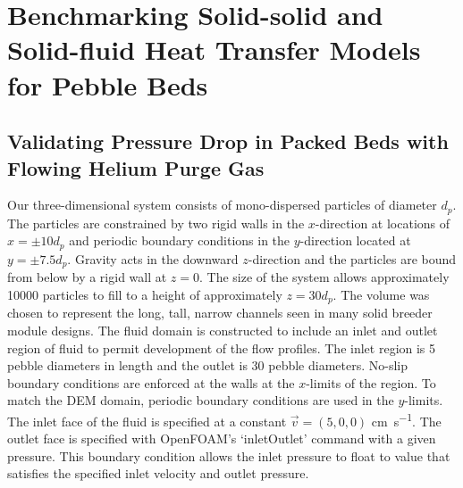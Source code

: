 \FloatBarrier
\section{Benchmarking Solid-solid and Solid-fluid Heat Transfer Models for Pebble Beds}

\subsection{Validating Pressure Drop in Packed Beds with Flowing Helium Purge Gas}
Our three-dimensional system consists of mono-dispersed particles of diameter $d_p$. The particles are constrained by two rigid walls in the $x$-direction at locations of $x = \pm 10d_p$  and periodic boundary conditions in the $y$-direction located at $y = \pm 7.5d_p$. Gravity acts in the downward $z$-direction and the particles are bound from below by a rigid wall at $z=0$. The size of the system allows approximately \num{10000} particles to fill to a height of approximately $z = 30d_p$. The volume was chosen to represent the long, tall, narrow channels seen in many solid breeder module designs\cite{Cho2008,Poitevin2010,Enoeda2003}. The fluid domain is constructed to include an inlet and outlet region of fluid to permit development of the flow profiles. The inlet region is 5 pebble diameters in length and the outlet is 30 pebble diameters. No-slip boundary conditions are enforced at the walls at the $x$-limits of the region. To match the DEM domain, periodic boundary conditions are used in the $y$-limits. The inlet face of the fluid is specified at a constant $\vec{v} = (5, 0, 0)$ \si{\centi\meter\per\second}. The outlet face is specified with OpenFOAM's `inletOutlet' command with a given pressure. This boundary condition allows the inlet pressure to float to value that satisfies the specified inlet velocity and outlet pressure. %


